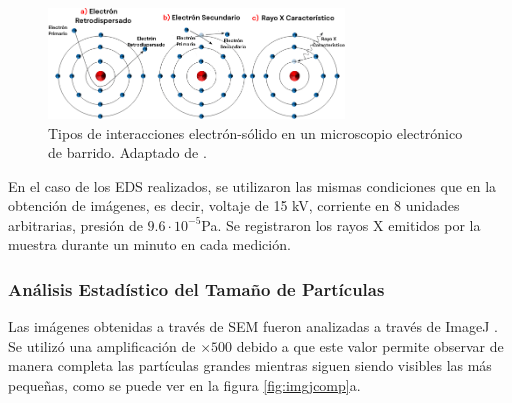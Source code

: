 \documentclass[../main.tex]{subfiles}
\begin{document}
\begin{figure}[H]
    \centering
    \includegraphics[width=0.7\textwidth]{fig/semtipos.png}
    \caption{Tipos de interacciones electrón-sólido en un microscopio electrónico de barrido. Adaptado de \cite{Jensen2022}.}
    \label{semtipos}
\end{figure}
En el caso de los EDS realizados, se utilizaron las mismas condiciones que en la obtención de imágenes, es decir, voltaje de 15 kV, corriente en 8 unidades arbitrarias, presión de $9.6\cdot10^{-5}$Pa. Se registraron los rayos X emitidos por la muestra durante un minuto en cada medición.
\subsubsection{Análisis Estadístico del Tamaño de Partículas} \label{sec:analisisestadistico}
Las imágenes obtenidas a través de SEM fueron analizadas a través de ImageJ \cite{ImageJ}. Se utilizó una amplificación de $\times500$ debido a que este valor permite observar de manera completa las partículas grandes mientras siguen siendo visibles las más pequeñas, como se puede ver en la figura \ref{fig:imgjcomp}a.
\end{document}
